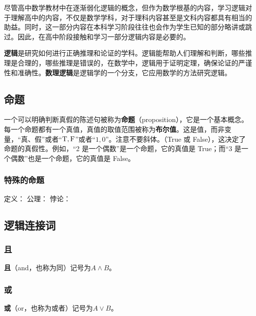 
\begin{issues}
\issueDraft
\end{issues}

尽管高中数学教材中在逐渐弱化逻辑的概念，但作为数学根基的内容，学习逻辑对于理解高中的内容，不仅是数学学科，对于理科内容甚至是文科内容都具有相当的助益。同时，这一部分内容在本科学习阶段往往也会作为学生已知的部分略讲或跳过。因此，在高中阶段接触和学习一部分逻辑内容是必要的。

\textbf{逻辑}是研究如何进行正确推理和论证的学科。逻辑能帮助人们理解和判断，哪些推理是合理的，哪些推理是错误的，在数学中，逻辑用于证明定理，确保论证的严谨性和准确性。\textbf{数理逻辑}是逻辑学的一个分支，它应用数学的方法研究逻辑。


\subsection{命题}


一个可以明确判断真假的陈述句被称为\textbf{命题}（proposition），它是一个基本概念。每一个命题都有一个真值，真值的取值范围被称为\textbf{布尔值}。这是值，而非变量，“真、假”或者“${\rm T,F}$”或者“$1,0$”。注意不要斜体。（True 或 False），这决定了命题的真假性。例如，“2 是一个偶数”是一个命题，它的真值是 True；而“3 是一个偶数”也是一个命题，它的真值是 False。



\subsubsection{特殊的命题}
定义：
公理：
悖论：

\subsection{逻辑连接词}

\subsubsection{且}

\textbf{且}（and，也称为同）记号为$A\land B$。

\subsubsection{或}

\textbf{或}（or，也称为或者）记号为$A\lor B$。


